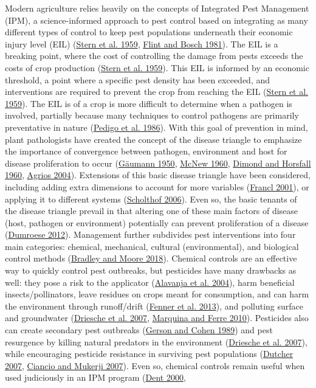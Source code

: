 \documentclass{ufdissertation}[overrideChapters] %
\begin{document}
{Modern agriculture relies heavily on the concepts of Integrated Pest Management (IPM), a science-informed approach to pest control based on integrating as many different types of control to keep pest populations underneath their economic injury level (EIL) (\protect\hyperlink{ref-Stern1959}{Stern et al. 1959}, \protect\hyperlink{ref-Flint1981}{Flint and Bosch 1981}). The EIL is a breaking point, where the cost of controlling the damage from pests exceeds the costs of crop production (\protect\hyperlink{ref-Stern1959}{Stern et al. 1959}). This EIL is informed by an economic threshold, a point where a specific pest density has been exceeded, and interventions are required to prevent the crop from reaching the EIL (\protect\hyperlink{ref-Stern1959}{Stern et al. 1959}). The EIL is of a crop is more difficult to determine when a pathogen is involved, partially because many techniques to control pathogens are primarily preventative in nature (\protect\hyperlink{ref-Pedigo1986}{Pedigo et al. 1986}). With this goal of prevention in mind, plant pathologists have created the concept of the disease triangle to emphasize the importance of convergence between pathogen, environment and host for disease proliferation to occur (\protect\hyperlink{ref-Gaeumann1950}{Gäumann 1950}, \protect\hyperlink{ref-McNew1960}{McNew 1960}, \protect\hyperlink{ref-Stevens1960}{Dimond and Horsfall 1960}, \protect\hyperlink{ref-Agrios2004}{Agrios 2004}). Extensions of this basic disease triangle have been considered, including adding extra dimensions to account for more variables (\protect\hyperlink{ref-Francl2001}{Francl 2001}), or applying it to different systems (\protect\hyperlink{ref-Scholthof2006}{Scholthof 2006}). Even so, the basic tenants of the disease triangle prevail in that altering one of these main factors of disease (host, pathogen or environment) potentially can prevent proliferation of a disease (\protect\hyperlink{ref-Dumroese2012}{Dumroese 2012}). Management further subdivides pest interventions into four main categories: chemical, mechanical, cultural (environmental), and biological control methods (\protect\hyperlink{ref-Bradley2018}{Bradley and Moore 2018}). Chemical controls are an effective way to quickly control pest outbreaks, but pesticides have many drawbacks as well: they pose a risk to the applicator (\protect\hyperlink{ref-Alavanja2004}{Alavanja et al. 2004}), harm beneficial insects/pollinators, leave residues on crops meant for consumption, and can harm the environment through runoff/drift (\protect\hyperlink{ref-Fenner2013}{Fenner et al. 2013}), and polluting surface and groundwater (\protect\hyperlink{ref-Driesche2007}{Driesche et al. 2007}, \protect\hyperlink{ref-Marquina2010}{Marquina and Ferre 2010}). Pesticides also can create secondary pest outbreaks (\protect\hyperlink{ref-Gerson1989}{Gerson and Cohen 1989}) and pest resurgence by killing natural predators in the environment (\protect\hyperlink{ref-Driesche2007}{Driesche et al. 2007}), while encouraging pesticide resistance in surviving pest populations (\protect\hyperlink{ref-Dutcher2007}{Dutcher 2007}, \protect\hyperlink{ref-Ciancio2007}{Ciancio and Mukerji 2007}). Even so, chemical controls remain useful when used judiciously in an IPM program (\protect\hyperlink{ref-Dent2000}{Dent 2000}, }
\end{document}
